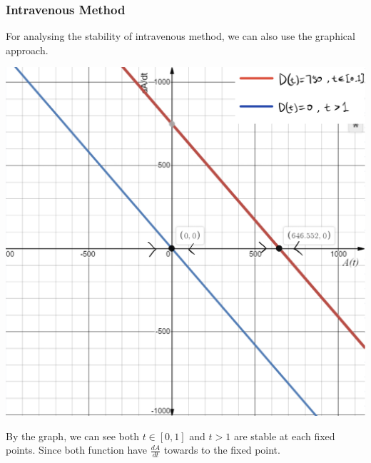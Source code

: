 \documentclass{article}
\begin{document}
\subsubsection*{Intravenous Method}
For analysing the stability of intravenous method, we can also use the graphical approach. \\
\begin{center}
    \includegraphics[scale = 0.15]{IntravStab.jpg}
\end{center}


    
By the graph, we can see both $t\in [0,1]$ and $t>1$ are stable at each fixed points. Since both function have $\frac{dA}{dt}$ towards to the fixed point.\\
\end{document}
